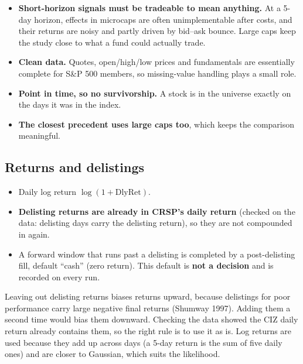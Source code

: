 \begin{whybox}
\begin{itemize}
\item \textbf{Short-horizon signals must be tradeable to mean anything.} At a 5-day horizon, effects in
  microcaps are often unimplementable after costs, and their returns are noisy and partly driven by
  bid--ask bounce. Large caps keep the study close to what a fund could actually trade.
\item \textbf{Clean data.} Quotes, open/high/low prices and fundamentals are essentially complete for S\&P 500
  members, so missing-value handling plays a small role.
\item \textbf{Point in time, so no survivorship.} A stock is in the universe exactly on the days it was in the
  index.
\item \textbf{The closest precedent uses large caps too}, which keeps the comparison meaningful.
\end{itemize}
\end{whybox}

\subsection{Returns and delistings}

\begin{itemize}
\item Daily log return $\log(1+\text{DlyRet})$.
\item {} \textbf{Delisting returns are already in CRSP's daily return} (checked on the data:
  delisting days carry the delisting return), so they are not compounded in again.
\item A forward window that runs past a delisting is completed by a post-delisting fill, default ``cash''
  (zero return). This default is \textbf{not a decision} and is recorded on every run.
\end{itemize}

\begin{whybox}
Leaving out delisting returns biases returns upward, because delistings for poor performance carry large
negative final returns (Shumway 1997). Adding them a second time would bias them downward. Checking the data
showed the CIZ daily return already contains them, so the right rule is to use it as is. Log returns are
used because they add up across days (a 5-day return is the sum of five daily ones) and are closer to
Gaussian, which suits the likelihood.
\end{whybox}

